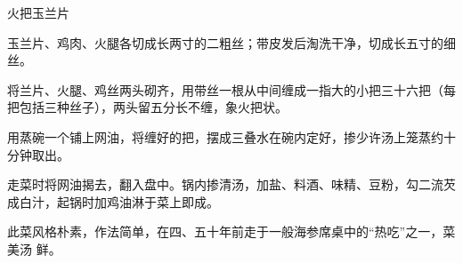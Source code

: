 \begin{recipe}{火把玉兰片}

\ingredients


\preparation

\step 玉兰片、鸡肉、火腿各切成长两寸的二粗丝；带皮发后淘洗干净，切成长五寸的细
丝。

\step 将兰片、火腿、鸡丝两头砌齐，用带丝一根从中间缠成一指大的小把三十六把（每
把包括三种丝子），两头留五分长不缠，象火把状。

\step 用蒸碗一个铺上网油，将缠好的把，摆成三叠水在碗内定好，掺少许汤上笼蒸约十
分钟取出。

\step 走菜时将网油揭去，翻入盘中。锅内掺清汤，加盐、料酒、味精、豆粉，勾二流芡
成白汁，起锅时加鸡油淋于菜上即成。

\features

此菜风格朴素，作法简单，在四、五十年前走于一般海参席桌中的“热吃”之一，菜美汤
鲜。

\end{recipe}

